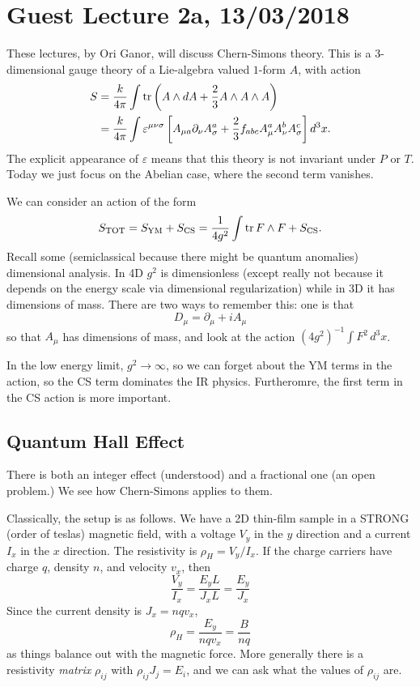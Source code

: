 \section*{Guest Lecture 2a, 13/03/2018}
These lectures, by Ori Ganor, will discuss Chern-Simons theory.
This is a $3$-dimensional gauge theory of a Lie-algebra valued $1$-form $A$, with action
\begin{align*}
S &= \frac{k}{4 \pi} \int \operatorname{tr} \left( A \wedge dA + \frac{2}{3} A \wedge A \wedge A\right)\\
&= \frac{k}{4 \pi} \int \varepsilon^{\mu \nu \sigma} \left[A_{\mu a} \partial_\nu A_\sigma^a + \frac{2}{3} f_{abc} A_\mu^a A_\nu^b A_\sigma^c \right] d^3x.
\end{align*}
The explicit appearance of $\varepsilon$ means that this theory is not invariant under  $P$ or $T$.
Today we just focus on the Abelian case, where the second term vanishes.

We can consider an action of the form
\[
S_{\text{TOT}} = S_{\text{YM}} + S_{\text{CS}} = \frac{1}{4g^2} \int \operatorname{tr} F \wedge F + S_{\text{CS}}.
\]
Recall some (semiclassical because there might be quantum anomalies) dimensional analysis.
In 4D $g^2$ is dimensionless (except really not because it depends on the energy scale via dimensional regularization) while in 3D it has dimensions of mass.
There are two ways to remember this: one is that
\[
D_{\mu} = \partial_\mu + i A_\mu
\]
so that $A_\mu$ has dimensions of mass, and look at the action $(4g^2)^{-1} \int F^2 \,d^3x$.

In the low energy limit, $g^2 \to \infty$, so we can forget about the YM terms in the action, so the CS term dominates the IR physics.
Furtheromre, the first term in the CS action is more important.

\subsection*{Quantum Hall Effect}
There is both an integer effect (understood) and a fractional one (an open problem.)
We see how Chern-Simons applies to them.

Classically, the setup is as follows.
We have a 2D thin-film sample in a STRONG (order of teslas) magnetic field, with a voltage $V_y$ in the $y$ direction and a current $I_x$ in the $x$ direction.
The resistivity is $\rho_H = V_y/I_x$.
If the charge carriers have charge $q$, density $n$, and velocity $v_x$, then
\[
\frac{V_y}{I_x} = \frac{E_y L}{J_x L} = \frac{E_y}{J_x}
\]
Since the current density is $J_x = nq v_x$,
\[
\rho_H = \frac{E_y}{n q v_x} = \frac{B}{nq}
\]
as things balance out with the magnetic force.
More generally there is a resistivity \emph{matrix} $\rho_{ij}$ with $\rho_{ij} J_j = E_i$, and we can ask what the values of $\rho_{ij}$ are.


